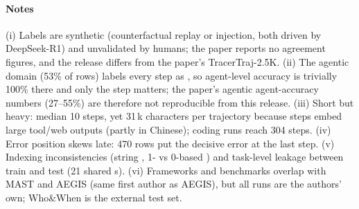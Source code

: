 \paragraph{Notes} (i) Labels are synthetic (counterfactual replay or injection, both driven by DeepSeek-R1) and unvalidated by humans; the paper reports no agreement figures, and the release differs from the paper's TracerTraj-2.5K. (ii) The agentic domain (53\% of rows) labels every step as , so agent-level accuracy is trivially 100\% there and only the step matters; the paper's agentic agent-accuracy numbers (27--55\%) are therefore not reproducible from this release. (iii) Short but heavy: median 10 steps, yet 31\,k characters per trajectory because steps embed large tool/web outputs (partly in Chinese); coding runs reach 304 steps. (iv) Error position skews late: 470 rows put the decisive error at the last step. (v) Indexing inconsistencies (string , 1- vs 0-based ) and task-level leakage between train and test (21 shared s). (vi) Frameworks and benchmarks overlap with MAST and AEGIS (same first author as AEGIS), but all runs are the authors' own; Who\&When is the external test set.
